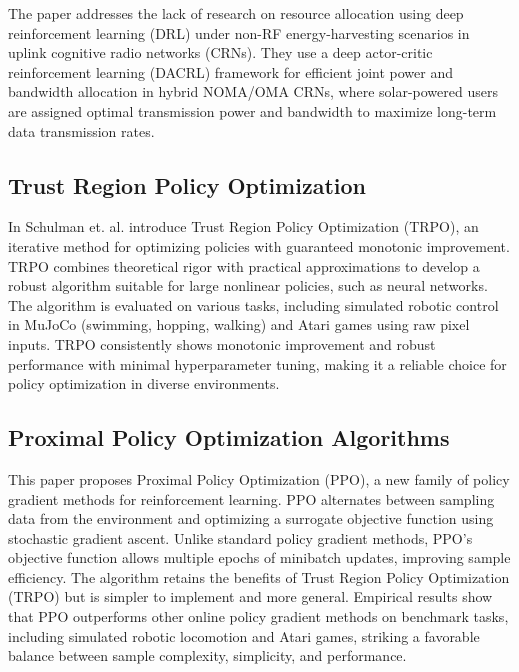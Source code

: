 \documentclass[journal]{IEEEtran}
\begin{document}
The paper addresses the lack of research on resource allocation using deep reinforcement learning 
(DRL) under non-RF energy-harvesting scenarios in uplink cognitive radio networks (CRNs).
They use a deep actor-critic reinforcement learning (DACRL) framework for efficient joint power and
bandwidth allocation in hybrid NOMA/OMA CRNs, where solar-powered users are assigned optimal 
transmission power and bandwidth to maximize long-term data transmission rates.

\subsection{Trust Region Policy Optimization}
In \cite{schulman2017} Schulman et. al. introduce Trust Region Policy Optimization (TRPO), 
an iterative method for optimizing policies with guaranteed monotonic improvement. 
TRPO combines theoretical rigor with practical approximations to develop a robust algorithm 
suitable for large nonlinear policies, such as neural networks. 
The algorithm is evaluated on various tasks, including simulated robotic control in MuJoCo
(swimming, hopping, walking) and Atari games using raw pixel inputs. 
TRPO consistently shows monotonic improvement and robust performance with minimal hyperparameter 
tuning, making it a reliable choice for policy optimization in diverse environments.






\subsection{Proximal Policy Optimization Algorithms}
This paper proposes Proximal Policy Optimization (PPO), a new family of policy gradient methods for reinforcement learning. PPO alternates between sampling data from the environment and optimizing a surrogate objective function using stochastic gradient ascent. Unlike standard policy gradient methods, PPO's objective function allows multiple epochs of minibatch updates, improving sample efficiency. The algorithm retains the benefits of Trust Region Policy Optimization (TRPO) but is simpler to implement and more general. Empirical results show that PPO outperforms other online policy gradient methods on benchmark tasks, including simulated robotic locomotion and Atari games, striking a favorable balance between sample complexity, simplicity, and performance.
\cite{schulman2017a}
\end{document}
